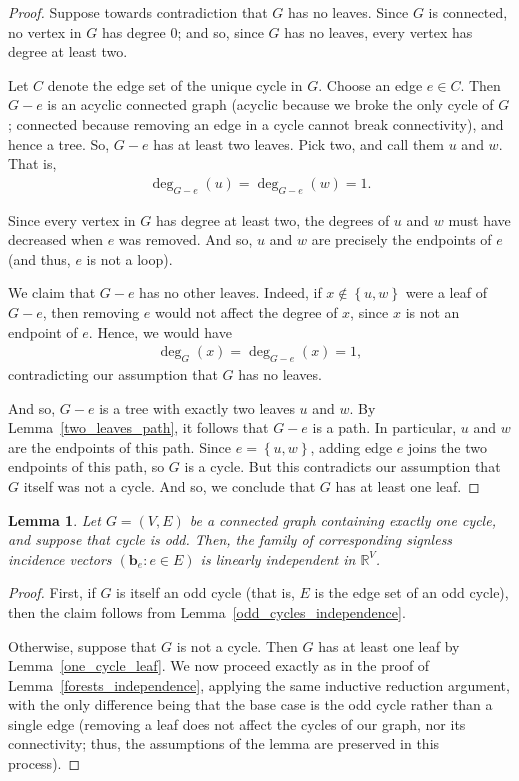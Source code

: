 \documentclass[12pt]{article}
\newtheorem{lemma}[theorem]{Lemma}
\theoremstyle{definition}
\theoremstyle{remark}
\newcommand{\set}[1]{\left\{ #1 \right\}}
\newcommand{\tup}[1]{\left( #1 \right)}
\begin{document}
\begin{proof}
    Suppose towards contradiction that $G$ has no leaves. Since $G$ is connected, no vertex in $G$ has degree $0$; and so, since $G$ has no leaves, every vertex has degree at least two.

    Let $C$ denote the edge set of the unique cycle in $G$. Choose an edge $e \in C$. Then $G-e$ is an acyclic connected graph (acyclic because we broke the only cycle of $G$; connected because removing an edge in a cycle cannot break connectivity),
    and hence a tree. So, $G-e$ has at least two leaves. Pick two, and call them $u$ and $w$. That is, \begin{align*}
        \deg_{G-e}(u)=\deg_{G-e}(w)=1.
    \end{align*} 
    
    Since every vertex in $G$ has degree at least two, the degrees of $u$ and $w$ must have decreased when $e$ was removed. And so, $u$ and $w$ are precisely the endpoints of $e$
    (and thus, $e$ is not a loop).

    We claim that $G-e$ has no other leaves. Indeed, if $x \notin \set{u,w}$ were a leaf of $G-e$, then removing $e$ would not affect the degree of $x$, since $x$ is not an endpoint of $e$. Hence, we would have \begin{align*}
        \deg_G(x)=\deg_{G-e}(x)=1,
    \end{align*} contradicting our assumption that $G$ has no leaves.

    And so, $G-e$ is a tree with exactly two leaves $u$ and $w$. By Lemma~\ref{two_leaves_path}, it follows that $G-e$ is a path. In particular, $u$ and $w$ are the endpoints of this path. Since $e = \set{u,w}$, adding edge $e$ joins the two endpoints of this path, so $G$ is a cycle. But this contradicts our assumption that $G$ itself was not a cycle. And so, we conclude that $G$ has at least one leaf.
\end{proof}

\begin{lemma}\label{odd_cycle_components}
    Let $G=(V,E)$ be a connected graph containing exactly one cycle, and suppose that cycle is odd. Then, the family of corresponding signless incidence vectors $\tup{\mathbf{b}_e : e \in E}$ is linearly independent in $\mathbb{R}^V$.
\end{lemma}

\begin{proof}
    First, if $G$ is itself an odd cycle (that is, $E$ is the edge set of an odd cycle), then the claim follows from Lemma~\ref{odd_cycles_independence}.

    Otherwise, suppose that $G$ is not a cycle. Then $G$ has at least one leaf by Lemma~\ref{one_cycle_leaf}. We now proceed exactly as in the proof of Lemma~\ref{forests_independence}, applying the same inductive reduction argument, with the only difference being that the base case is the odd cycle rather than a single edge
    (removing a leaf does not affect the cycles of our graph, nor its connectivity; thus, the assumptions of the lemma are preserved in this process).
\end{proof}
\end{document}
